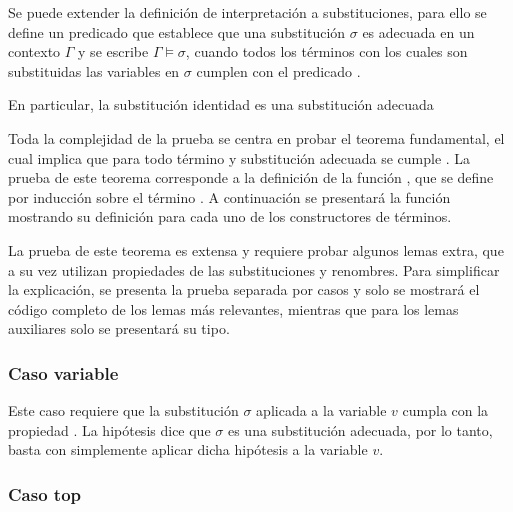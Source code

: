 Se puede extender la definición de interpretación a substituciones, para ello se define un predicado que establece que una substitución $\sigma$ es adecuada en un contexto $\Gamma$ y se escribe $\Gamma \vDash \sigma$, cuando todos los términos con los cuales son substituidas las variables en $\sigma$ cumplen con el predicado \snstar.


En particular, la substitución identidad  es una substitución adecuada


Toda la complejidad de la prueba se centra en probar el teorema fundamental, el cual implica que para todo término  y substitución adecuada  se cumple
\snstar{}.
La prueba de este teorema corresponde a la definición de la función , que se define por inducción sobre el término .
A continuación se presentará la función mostrando su definición para cada uno de los constructores de términos.


La prueba de este teorema es extensa y requiere probar algunos lemas extra, que a su vez utilizan propiedades de las substituciones y renombres.
Para simplificar la explicación, se presenta la prueba separada por casos y solo se mostrará el código completo de los lemas más relevantes, mientras que para los lemas auxiliares solo se presentará su tipo.

\subsubsection{Caso variable}

Este caso requiere que la substitución $\sigma$ aplicada a la variable $v$ cumpla con la propiedad
\snstar.
La hipótesis dice que $\sigma$ es una substitución adecuada, por lo tanto, basta con simplemente aplicar dicha hipótesis a la variable $v$.


\subsubsection{Caso top}

